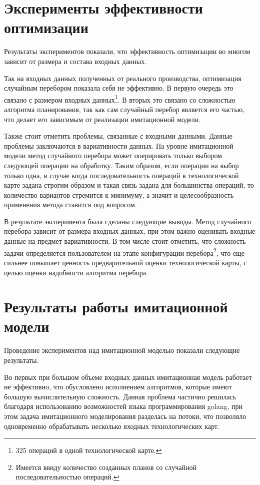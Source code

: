 \section*{Эксперименты эффективности оптимизации}
\label{experiment}
Результаты экспериментов показали, что эффективность оптимизации во многом зависит от размера и состава входных данных.

Так на входных данных полученных от реального производства, оптимизация случайным перебором показала себя не эффективно. В первую очередь это связано с размером входных данных\footnote{325 операций в одной технологической карте.}. В вторых это связано со сложностью алгоритма планирования, так как сам случайный перебор является его частью, что делает его зависимым от реализации имитационной модели.

Также стоит отметить проблемы, связанные с входными данными. Данные проблемы заключаются в вариативности данных. На уровне имитационной модели метод случайного перебора может оперировать только выбором следующей операции на обработку. Таким образом, если операции на выбор только одна, в случае когда последовательность операций в технологической карте задана строгим образом и такая связь задана для большинства операций, то количество вариантов стремится к минимуму, а значит и целесообразность применения метода ставится под вопросом.

В результате эксперимента была сделаны следующие выводы. Метод случайного перебора зависит от размера входных данных, при этом важно оценивать входные данные на предмет вариативности. В том числе стоит отметить, что сложность задачи определяется пользователем на этапе конфигурации перебора\footnote{Имеется ввиду количество созданных планов со случайной последовательностью операций.}, что еще сильнее повышает ценность предварительной оценки технологической карты, с целью оценки надобности алгоритма перебора.

\section{Результаты работы имитационной модели}

Проведение экспериментов над имитационной моделью показали следующие результаты.

Во первых при большом объеме входных данных имитационная модель работает не эффективно, что обусловлено исполнением алгоритмов, которые имеют большую вычислительную сложность.
Данная проблема частично решилась благодаря использованию возможностей языка программирования golang, при этом задача имитационного моделирования разделась на потоки, что позволяло одновременно обрабатывать несколько входных технологических карт.

